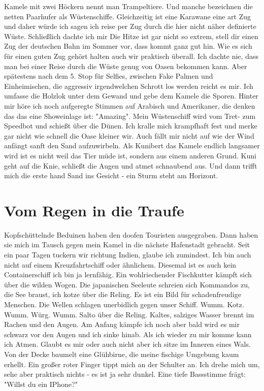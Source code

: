 \documentclass[11pt]{article}
\begin{document}
Kamele mit zwei Höckern nennt man Trampeltiere. Und manche
bezeichnen die netten Paarhufer als Wüstenschiffe. Gleichzeitig ist
eine Karawane eine art Zug und daher würde ich sagen ich reise per
Zug durch die hier nicht näher definierte Wüste.  Schließlich dachte
ich mir Die Hitze ist gar nicht so extrem, stell dir einen Zug der
deutschen Bahn im Sommer vor, dass kommt ganz gut hin. Wie es sich
für einen guten Zug gehört halten auch wir praktisch überall. Ich
dachte nie, dass man bei einer Reise durch die Wüste genug von Oasen
bekommen kann. Aber spätestens nach dem 5. Stop für Selfies,
zwischen Fake Palmen und Einheimischen, die aggressiv irgendwelchen
Schrott los werden reicht es mir. Ich umfasse die Holzlok unter dem
Gewand und gebe dem Kamele die Sporen. Hinter mir höre ich noch
aufgeregte Stimmen auf Arabisch und Amerikaner, die denken das das
eine Showeinlage ist: "Amazing". Mein Wüstenschiff wird vom Tret-
zum Speedbot und schießt über die Dünen. Ich kralle mich krampfhaft
fest und merke gar nicht wie schnell die Oase kleiner wir. Auch
fällt mir nicht auf wie der Wind anfängt sanft den Sand
aufzuwirbeln. Als Kunibert das Kamele endlich langsamer wird ist es
nicht weil das Tier müde ist, sondern aus einem anderen Grund. Kuni
geht auf die Knie, schließt die Augen und atmet schnaubend aus. Und
dann trifft mich die erste hand Sand ins Gesicht - ein Sturm steht
am Horizont.
\section{Vom Regen in die Traufe}
\label{sec:orgddfa44b}
Kopfschüttelnde Beduinen haben den doofen Touristen
ausgegraben. Dann haben sie mich im Tausch gegen mein Kamel in die
nächste Hafenstadt gebracht. Seit ein paar Tagen tuckern wir
richtung Indien, glaube ich zumindest. Ich bin auch nicht auf einem
Kreuzfahrtschiff oder ähnlichem. Diesemal ist es auch kein
Containerschiff ich bin ja lernfähig. Ein wohlriechender Fischkutter
kämpft sich über die wilden Wogen. Die japanischen Seeleute schreien
sich Kommandos zu, die See braust, ich kotze über die Reling. Es ist
ein Bild für schadenfreudige Menschen. Die Wellen schlagen
unerbidlich gegen unser Schiff. Wumm. Kotz. Wumm. Würg. Wumm. Salto
über die Reling. Kaltes, salziges Wasser brennt im Rachen und den
Augen. Am Anfang kämpfe ich noch aber bald wird es mir schwarz vor
den Augen und ich sinke hinab. Als ich wieder zu mir komme kann ich
Atmen. Glaubt es mir oder auch nicht aber ich sitze im Inneren eines
Wals. Von der Decke baumelt eine Glühbirne, die meine fischige
Umgebung kaum erhellt. Ein großer roter Finger tippt mich an der
Schulter an. Ich drehe mich um, sehe aber praktisch nichts - es ist
ja sehr dunkel. Eine tiefe Bassstimme frägt: "Willst du ein IPhone?"
\end{document}
